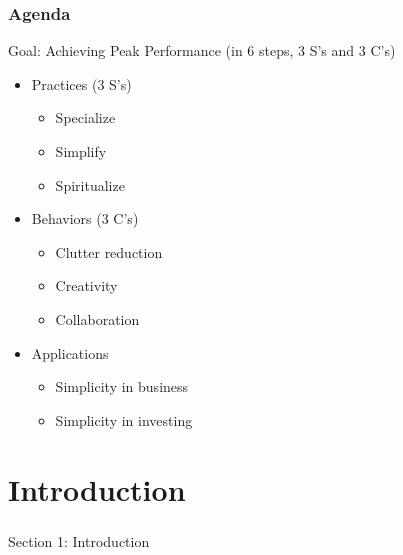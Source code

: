 \begin{frame}[fragile]\frametitle{Agenda}

Goal: Achieving Peak Performance (in 6 steps, 3 S's and 3 C's)

\begin{itemize}
\item Practices (3 S's)
	\begin{itemize}
	\item Specialize
	\item Simplify
	\item Spiritualize
	\end{itemize}

\item Behaviors (3 C's)
	\begin{itemize}
	\item Clutter reduction
	\item Creativity
	\item Collaboration
	\end{itemize}
	
\item Applications
	\begin{itemize}
	\item Simplicity in business
	\item Simplicity in investing
	\end{itemize}	
\end{itemize}

\end{frame}

\section{Introduction}

\begin{frame}[fragile]\frametitle{}
\begin{center}
{\Large Section 1: Introduction}
\end{center}
\end{frame}

